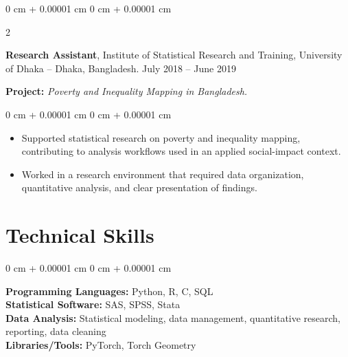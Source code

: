 \documentclass[10pt, letterpaper]{article}
\newenvironment{highlights}{
    \begin{itemize}[
        topsep=0.10 cm,
        parsep=0.10 cm,
        partopsep=0pt,
        itemsep=0pt,
        leftmargin=0 cm + 10pt
    ]
}{
    \end{itemize}
} %
\newenvironment{onecolentry}{
    \begin{adjustwidth}{
        0 cm + 0.00001 cm
    }{
        0 cm + 0.00001 cm
    }
}{
    \end{adjustwidth}
} %
\newenvironment{twocolentry}[2][]{
    \onecolentry
    \def\secondColumn{#2}
    \setcolumnwidth{\fill, 4.5 cm}
    \begin{paracol}{2}
}{
    \switchcolumn \raggedleft \secondColumn
    \end{paracol}
    \endonecolentry
} %
\begin{document}
    \begin{twocolentry}{
            July 2018 -- June 2019
        }
            \textbf{Research Assistant}, Institute of Statistical Research and Training, University of Dhaka -- Dhaka, Bangladesh.\end{twocolentry} 
            \textbf{Project: }\textit{Poverty and Inequality Mapping in Bangladesh.}\\
    \begin{onecolentry}
        \begin{highlights}
            \item Supported statistical research on poverty and inequality mapping, contributing to analysis workflows used in an applied social-impact context.
            \item Worked in a research environment that required data organization, quantitative analysis, and clear presentation of findings.
        \end{highlights}
    \end{onecolentry}
       

    \section{Technical Skills} 
        \begin{onecolentry}
            \textbf{Programming Languages:} Python, R, C, SQL\\
            \textbf{Statistical Software:} SAS, SPSS, Stata\\
            \textbf{Data Analysis:} Statistical modeling, data management, quantitative research, reporting, data cleaning\\
            \textbf{Libraries/Tools:} PyTorch, Torch Geometry
        \end{onecolentry}
        
\end{document}
